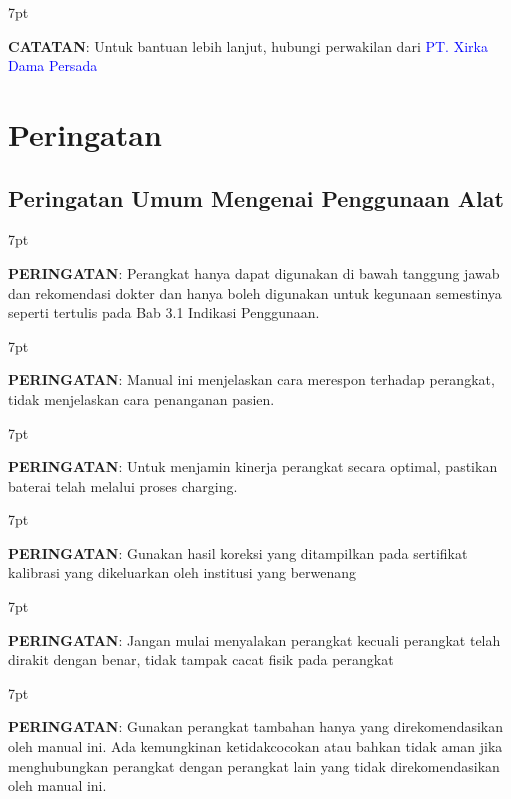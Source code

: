 \documentclass[11pt,a4paper,twoside,onecolumn]{book}
\newenvironment{formalred}{%
	\def\FrameCommand{%
		\hspace{1pt}%
		{\color{red}\vrule width 2pt}%
		{\color{formalshade}\vrule width 4pt}%
		\colorbox{formalshade}%
	}%
	\MakeFramed{\advance\hsize-\width\FrameRestore}%
	\noindent\hspace{-4.55pt}%
	\begin{adjustwidth}{}{7pt}%
		\vspace{2pt}\vspace{2pt}%
	}
	{%
		\vspace{2pt}\end{adjustwidth}\endMakeFramed%
}
\newenvironment{formalblue}{%
	\def\FrameCommand{%
		\hspace{1pt}%
		{\color{blue}\vrule width 2pt}%
		{\color{formalshade}\vrule width 4pt}%
		\colorbox{formalshade}%
	}%
	\MakeFramed{\advance\hsize-\width\FrameRestore}%
	\noindent\hspace{-4.55pt}%
	\begin{adjustwidth}{}{7pt}%
		\vspace{2pt}\vspace{2pt}%
	}
	{%
		\vspace{2pt}\end{adjustwidth}\endMakeFramed%
}
\begin{document}
		\begin{formalblue}
			 \textbf{CATATAN}:
			Untuk bantuan lebih lanjut, hubungi perwakilan dari \textcolor{blue}{PT. Xirka Dama Persada} 
		\end{formalblue}
		
		\section{Peringatan}\label{sec:2.2}
			\subsection{Peringatan Umum Mengenai Penggunaan Alat}
				\begin{formalred}
					\raisebox{0.125ex}{\resizebox{!}{2ex}{\danger}} \textbf{PERINGATAN}:
					Perangkat hanya dapat digunakan di bawah tanggung jawab dan rekomendasi dokter dan hanya boleh digunakan untuk kegunaan semestinya seperti tertulis pada Bab 3.1 Indikasi Penggunaan. 
				\end{formalred}
			
				\begin{formalred}
					\raisebox{0.125ex}{\resizebox{!}{2ex}{\danger}} \textbf{PERINGATAN}: 
					Manual ini menjelaskan cara merespon terhadap perangkat, tidak menjelaskan cara penanganan pasien. 
				\end{formalred}
			
				\begin{formalred}
					\raisebox{0.125ex}{\resizebox{!}{2ex}{\danger}} \textbf{PERINGATAN}: 
					Untuk menjamin kinerja perangkat secara optimal, pastikan baterai telah melalui proses charging.
				\end{formalred}
				
				\begin{formalred}
					\raisebox{0.125ex}{\resizebox{!}{2ex}{\danger}} \textbf{PERINGATAN}: 
					Gunakan hasil koreksi yang ditampilkan pada sertifikat kalibrasi yang dikeluarkan oleh institusi yang berwenang
				\end{formalred}
			
				\begin{formalred}
					\raisebox{0.125ex}{\resizebox{!}{2ex}{\danger}} \textbf{PERINGATAN}: 
					Jangan mulai menyalakan perangkat kecuali perangkat telah dirakit dengan benar, tidak tampak cacat fisik pada perangkat
				\end{formalred}
			
				\begin{formalred}
					\raisebox{0.125ex}{\resizebox{!}{2ex}{\danger}} \textbf{PERINGATAN}: 
					Gunakan perangkat tambahan hanya yang direkomendasikan oleh manual ini. Ada kemungkinan ketidakcocokan atau bahkan tidak aman jika menghubungkan perangkat dengan perangkat lain yang tidak direkomendasikan oleh manual ini.
				\end{formalred}
			
\end{document}
